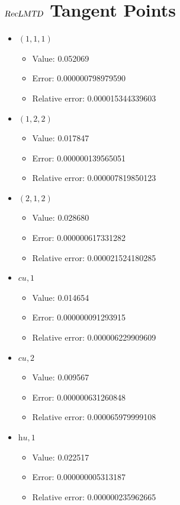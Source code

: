 \documentclass{article}%
\begin{document}
\section{$\textsl{RecLMTD}$ Tangent Points}%
\thispagestyle{plain}%
\begin{itemize}%
	\item $(1, 1, 1)$%
	\begin{itemize}%
		\item Value: 0.052069%
		\item Error: 0.000000798979590%
		\item Relative error: 0.000015344339603%
	\end{itemize}%
	\item $(1, 2, 2)$%
	\begin{itemize}%
		\item Value: 0.017847%
		\item Error: 0.000000139565051%
		\item Relative error: 0.000007819850123%
	\end{itemize}%
	\item $(2, 1, 2)$%
	\begin{itemize}%
		\item Value: 0.028680%
		\item Error: 0.000000617331282%
		\item Relative error: 0.000021524180285%
	\end{itemize}%
	\item $\textit{cu},1$%
	\begin{itemize}%
		\item Value: 0.014654%
		\item Error: 0.000000091293915%
		\item Relative error: 0.000006229909609%
	\end{itemize}%
	\item $\textit{cu},2$%
	\begin{itemize}%
		\item Value: 0.009567%
		\item Error: 0.000000631260848%
		\item Relative error: 0.000065979999108%
	\end{itemize}%
	\item $\textit{hu},1$%
	\begin{itemize}%
		\item Value: 0.022517%
		\item Error: 0.000000005313187%
		\item Relative error: 0.000000235962665%
	\end{itemize}%
\end{itemize}%
\end{document}
